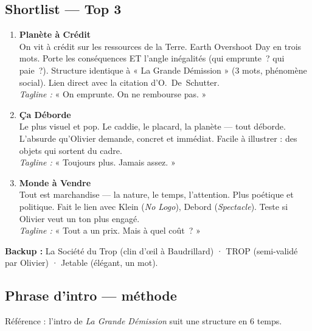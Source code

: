\documentclass[a4paper,11pt]{article}
\newcommand{\tagpill}[2]{%
  \tikz[baseline=(tag.base)]{%
    \node[fill=#1, text=white, rounded corners=3pt, inner sep=3pt, font=\tiny\bfseries] (tag) {#2};%
  }%
}
\begin{document}
\subsection{Shortlist — Top 3}

\begin{tcolorbox}
\begin{enumerate}[nosep, leftmargin=16pt]

\item \textbf{Planète à Crédit} \tagpill{consoBlue}{TOP 1}\\
On vit à crédit sur les ressources de la Terre. Earth Overshoot Day en trois mots. Porte les conséquences ET l'angle inégalités (qui emprunte~? qui paie~?). Structure identique à « La Grande Démission » (3 mots, phénomène social). Lien direct avec la citation d'O.~De~Schutter.\\
\textit{Tagline :} « On emprunte. On ne rembourse pas. »

\item \textbf{Ça Déborde} \tagpill{consoPink}{TOP 2}\\
Le plus visuel et pop. Le caddie, le placard, la planète — tout déborde. L'absurde qu'Olivier demande, concret et immédiat. Facile à illustrer : des objets qui sortent du cadre.\\
\textit{Tagline :} « Toujours plus. Jamais assez. »

\item \textbf{Monde à Vendre} \tagpill{consoYellow}{TOP 3}\\
Tout est marchandise — la nature, le temps, l'attention. Plus poétique et politique. Fait le lien avec Klein (\textit{No Logo}), Debord (\textit{Spectacle}). Teste si Olivier veut un ton plus engagé.\\
\textit{Tagline :} « Tout a un prix. Mais à quel coût~? »

\end{enumerate}
\end{tcolorbox}

\noindent \textbf{Backup :} La Société du Trop (clin d'œil à Baudrillard) · TROP (semi-validé par Olivier) · Jetable (élégant, un mot).

\subsection{Phrase d'intro — méthode}

Référence : l'intro de \textit{La Grande Démission} suit une structure en 6 temps.
\end{document}
